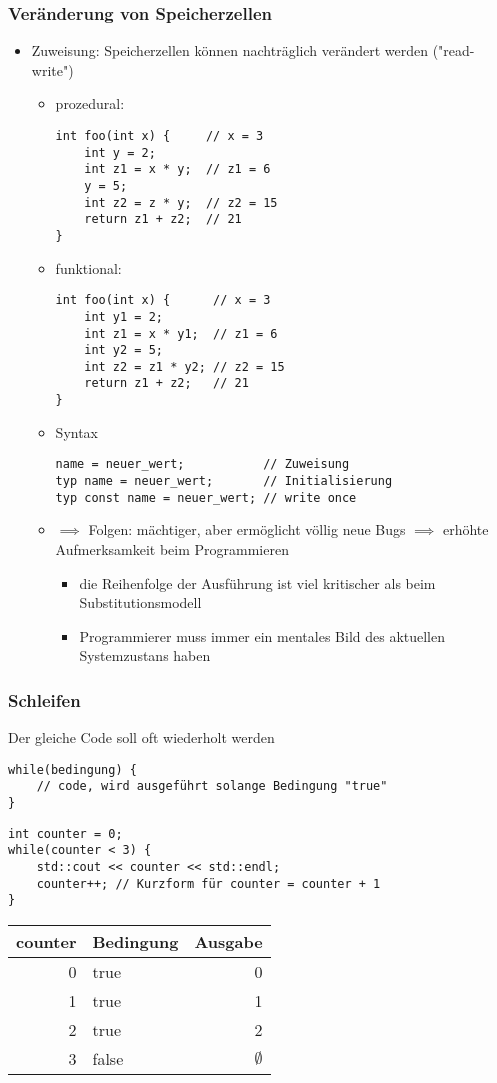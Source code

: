 \documentclass[a4paper]{scrartcl}
\begin{document}
\subsubsection{Veränderung von Speicherzellen}
\label{sec-7-2-3}
\begin{itemize}
\item Zuweisung: Speicherzellen können nachträglich verändert werden ("read-write")
\begin{itemize}
\item prozedural:
\begin{verbatim}
int foo(int x) {     // x = 3
	int y = 2;
	int z1 = x * y;  // z1 = 6
	y = 5;
	int z2 = z * y;  // z2 = 15
	return z1 + z2;  // 21
}
\end{verbatim}
\item funktional:
\begin{verbatim}
int foo(int x) {      // x = 3
	int y1 = 2;
	int z1 = x * y1;  // z1 = 6
	int y2 = 5;
	int z2 = z1 * y2; // z2 = 15
	return z1 + z2;   // 21
}
\end{verbatim}
\item Syntax
\begin{verbatim}
name = neuer_wert;           // Zuweisung
typ name = neuer_wert;       // Initialisierung
typ const name = neuer_wert; // write once
\end{verbatim}
\item $\implies$ Folgen: mächtiger, aber ermöglicht völlig neue Bugs $\implies$ erhöhte Aufmerksamkeit beim Programmieren
\begin{itemize}
\item die Reihenfolge der Ausführung ist viel kritischer als beim Substitutionsmodell
\item Programmierer muss immer ein mentales Bild des aktuellen Systemzustans haben
\end{itemize}
\end{itemize}
\end{itemize}
\subsubsection{Schleifen}
\label{sec-7-2-4}
Der gleiche Code soll oft wiederholt werden
\begin{verbatim}
while(bedingung) {
	// code, wird ausgeführt solange Bedingung "true"
}
\end{verbatim}
\begin{verbatim}
int counter = 0;
while(counter < 3) {
	std::cout << counter << std::endl;
	counter++; // Kurzform für counter = counter + 1
}
\end{verbatim}
\begin{center}
\begin{tabular}{rlr}
counter & Bedingung & Ausgabe\\
\hline
0 & true & 0\\
1 & true & 1\\
2 & true & 2\\
3 & false & $\emptyset$\\
\end{tabular}
\end{center}
\end{document}
